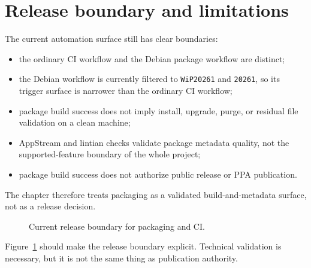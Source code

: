 \section{Release boundary and limitations}
\label{sec:packaging-release-boundary}

The current automation surface still has clear boundaries:
\begin{itemize}
\item the ordinary CI workflow and the Debian package workflow are distinct;
\item the Debian workflow is currently filtered to \texttt{WiP20261} and
  \texttt{20261}, so its trigger surface is narrower than the ordinary CI
  workflow;
\item package build success does not imply install, upgrade, purge, or residual
  file validation on a clean machine;
\item AppStream and lintian checks validate package metadata quality, not the
  supported-feature boundary of the whole project;
\item package build success does not authorize public release or PPA
  publication.
\end{itemize}

The chapter therefore treats packaging as a validated build-and-metadata
surface, not as a release decision.

\begin{figure}[htbp]
\centering
\caption{Current release boundary for packaging and CI.}
\label{fig:packaging-release-boundary}
\end{figure}

Figure~\ref{fig:packaging-release-boundary} should make the release boundary
explicit. Technical validation is necessary, but it is not the same thing as
publication authority.
